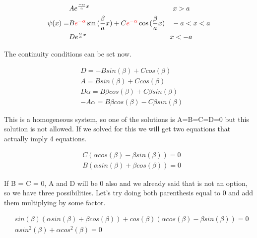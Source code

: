 \begin{equation}
    \label{3.22}
    \begin{split}
                    & Ae^{\frac{-\alpha}{a}x} \hspace{120pt} x > a
                    \\
       \psi(x) =    & B\textcolor{red}{e^{-\alpha}} \sin{(\frac{\beta}{a}x)} + C\textcolor{red}{e^{-\alpha}} \cos{(\frac{\beta}{a}x)} \hspace{10pt} -a < x < a 
                    \\
                    & De^{\frac{\alpha}{a}x} \hspace{120pt} x < -a
    \end{split}
\end{equation}



The continuity conditions can be set now.

\begin{equation}
    \label{3.23}
    \begin{split}
        &  D = -B sin(\beta) + C cos(\beta)
        \\
        & A = B sin(\beta) + C cos(\beta)
        \\
        & D\alpha = B\beta cos(\beta) + C \beta sin(\beta)
        \\
        & -A \alpha = B\beta cos(\beta)-C \beta sin(\beta)
    \end{split}
\end{equation}

This is a homogeneous system, so one of the solutions is A=B=C=D=0 but this solution is not allowed. If we solved for this we will get two equations that actually imply 4 equations.

\begin{equation}
\label{3.24}
\begin{split}
    & C (\alpha cos(\beta)-\beta sin(\beta)) = 0
    \\
    & B (\alpha sin(\beta)+\beta cos(\beta)) = 0
\end{split}
\end{equation}

If B = C = 0, A and D will be 0 also and we already said that is not an option, so we have three possibilities. Let's try doing both parenthesis equal to 0 and add them multiplying by some factor.

\begin{equation}
\begin{split}
        &
        sin(\beta)(\alpha sin(\beta) + \beta cos(\beta)) + cos(\beta)(\alpha cos(\beta) - \beta sin(\beta)) = 0 \\
        & \alpha sin^2(\beta) + \alpha cos^2(\beta) = 0
\end{split}
\end{equation}

